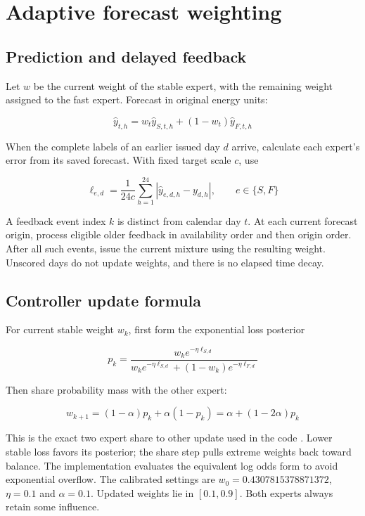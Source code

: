 \documentclass[pdflatex,iicol,sn-mathphys-num]{sn-jnl}
\begin{document}
\section{Adaptive forecast weighting}

\subsection{Prediction and delayed feedback}

Let $w$ be the current weight of the stable expert, with the remaining weight assigned to the fast expert. Forecast in original energy units:

\begin{equation}
\hat y_{t,h}=w_t\hat y_{S,t,h}+(1-w_t)\hat y_{F,t,h}
\end{equation}

When the complete labels of an earlier issued day $d$ arrive, calculate each expert's error from its saved forecast. With fixed target scale $c$, use

\begin{equation}
\ell_{e,d}=\frac{1}{24c}\sum_{h=1}^{24}|\hat y_{e,d,h}-y_{d,h}|,\qquad e\in\{S,F\}
\end{equation}

A feedback event index $k$ is distinct from calendar day $t$. At each current forecast origin, process eligible older feedback in availability order and then origin order. After all such events, issue the current mixture using the resulting weight. Unscored days do not update weights, and there is no elapsed time decay.

\subsection{Controller update formula}

For current stable weight $w_k$, first form the exponential loss posterior

\begin{equation}
p_k=\frac{w_k e^{-\eta\ell_{S,d}}}{w_k e^{-\eta\ell_{S,d}}+(1-w_k)e^{-\eta\ell_{F,d}}}
\end{equation}

Then share probability mass with the other expert:

\begin{equation}
w_{k+1}=(1-\alpha)p_k+\alpha(1-p_k)=\alpha+(1-2\alpha)p_k
\end{equation}

This is the exact two expert share to other update used in the code \cite{herbster1998}. Lower stable loss favors its posterior; the share step pulls extreme weights back toward balance. The implementation evaluates the equivalent log odds form to avoid exponential overflow. The calibrated settings are $w_0=0.4307815378871372$, $\eta=0.1$ and $\alpha=0.1$. Updated weights lie in $[0.1,0.9]$. Both experts always retain some influence.
\end{document}
